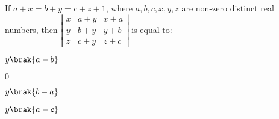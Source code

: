      \item If $a+x=b+y=c+z+1$, where $a, b, c, x, y, z$ are non-zero distinct real numbers, then  
    $\left| \begin{matrix} x & a+y & x+a \\ y & b+y & y+b \\z & c+y & z+c  \end{matrix} \right|$ is equal to:
     \begin{enumerate}
      \begin{multicols}{4}
      \item $y\brak{a-b}$
      \item $0$
      \item $y\brak{b-a}$
      \item $y\brak{a-c}$
       \end{multicols}
      \end{enumerate}

      
